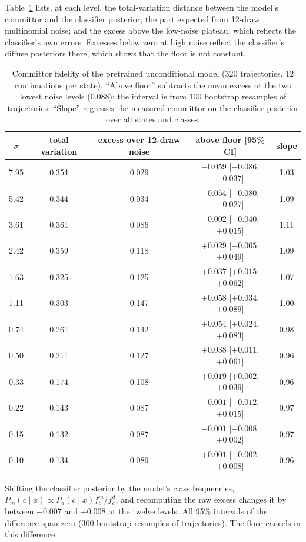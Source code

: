 Table~\ref{tab:fidelity} lists, at each level, the total-variation distance between the model's committor and the classifier posterior; the part expected from 12-draw multinomial noise; and the excess above the low-noise plateau, which reflects the classifier's own errors. Excesses below zero at high noise reflect the classifier's diffuse posteriors there, which shows that the floor is not constant.

\begin{table}[h]
\centering
\caption{Committor fidelity of the pretrained unconditional model (320 trajectories, 12 continuations per state). ``Above floor'' subtracts the mean excess at the two lowest noise levels ($0.088$); the interval is from 100 bootstrap resamples of trajectories. ``Slope'' regresses the measured committor on the classifier posterior over all states and classes.}
\label{tab:fidelity}
\small
\begin{tabular}{ccccc}
\toprule
$\sigma$ & total variation & excess over 12-draw noise & above floor [95\% CI] & slope \\
\midrule
7.95 & 0.354 & 0.029 & $-0.059$ [$-0.086$, $-0.037$] & 1.03 \\
5.42 & 0.344 & 0.034 & $-0.054$ [$-0.080$, $-0.027$] & 1.09 \\
3.61 & 0.361 & 0.086 & $-0.002$ [$-0.040$, $+0.015$] & 1.11 \\
2.42 & 0.359 & 0.118 & $+0.029$ [$-0.005$, $+0.049$] & 1.09 \\
1.63 & 0.325 & 0.125 & $+0.037$ [$+0.015$, $+0.062$] & 1.07 \\
1.11 & 0.303 & 0.147 & $+0.058$ [$+0.034$, $+0.089$] & 1.00 \\
0.74 & 0.261 & 0.142 & $+0.054$ [$+0.024$, $+0.083$] & 0.98 \\
0.50 & 0.211 & 0.127 & $+0.038$ [$+0.011$, $+0.061$] & 0.96 \\
0.33 & 0.174 & 0.108 & $+0.019$ [$+0.002$, $+0.039$] & 0.96 \\
0.22 & 0.143 & 0.087 & $-0.001$ [$-0.012$, $+0.015$] & 0.97 \\
0.15 & 0.132 & 0.087 & $-0.001$ [$-0.008$, $+0.002$] & 0.97 \\
0.10 & 0.134 & 0.089 & $+0.001$ [$-0.002$, $+0.008$] & 0.96 \\
\bottomrule
\end{tabular}
\end{table}

Shifting the classifier posterior by the model's class frequencies, $P_m(c\mid x)\propto P_d(c\mid x)f^m_c/f^d_c$, and recomputing the raw excess changes it by between $-0.007$ and $+0.008$ at the twelve levels. All 95\% intervals of the difference span zero (300 bootstrap resamples of trajectories). The floor cancels in this difference.

